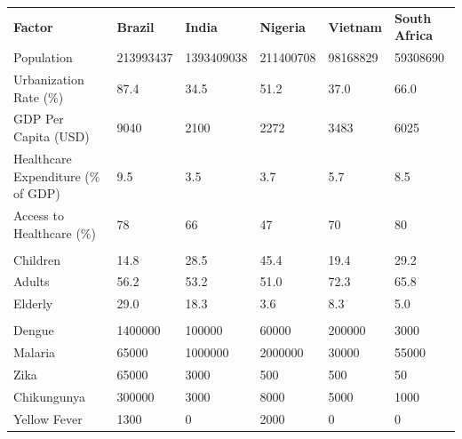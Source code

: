 \documentclass[border=10pt]{standalone}
\begin{document}
\begin{tabular}{l R{2cm} R{2cm} R{2cm} R{2cm} R{2cm}}
\toprule
{} \\
\midrule
{}\textbf{Factor} & \textbf{Brazil} & \textbf{India} & \textbf{Nigeria} & \textbf{Vietnam} & \textbf{South Africa} \\
\midrule
{}Population & \num{213993437} & \num{1393409038} & \num{211400708} & \num{98168829} & \num{59308690} \\
Urbanization Rate (\%) & 87.4 & 34.5 & 51.2 & 37.0 & 66.0 \\
GDP Per Capita (USD) & 9040 & 2100 & 2272 & 3483 & 6025 \\
Healthcare Expenditure (\% of GDP) & 9.5 & 3.5 & 3.7 & 5.7 & 8.5 \\
Access to Healthcare (\%) & 78 & 66 & 47 & 70 & 80 \\
\midrule
{} \\
\midrule
{}Children & 14.8 & 28.5 & 45.4 & 19.4 & 29.2 \\
Adults & 56.2 & 53.2 & 51.0 & 72.3 & 65.8 \\
Elderly & 29.0 & 18.3 & 3.6 & 8.3 & 5.0 \\
\midrule
{} \\
\midrule
{}Dengue & \num{1400000} & \num{100000} & \num{60000} & \num{200000} & \num{3000} \\
Malaria & \num{65000} & \num{1000000} & \num{2000000} & \num{30000} & \num{55000} \\
Zika & \num{65000} & \num{3000} & 500 & 500 & 50 \\
Chikungunya & \num{300000} & \num{3000} & \num{8000} & \num{5000} & \num{1000} \\
Yellow Fever & \num{1300} & 0 & \num{2000} & 0 & 0 \\
\bottomrule
\end{tabular}
\end{document}
